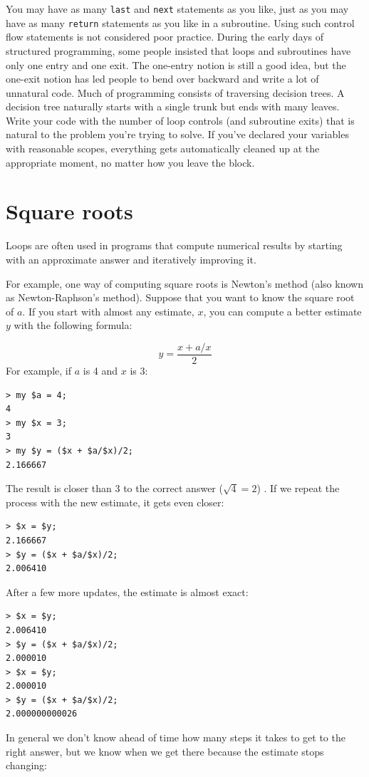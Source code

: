 You may have as many {\tt last} and {\tt next} statements as you 
like, just as you may have as many {\tt return} statements as 
you like in a subroutine. Using such control flow statements 
is not considered poor 
practice. During the early days of structured programming, 
some people insisted that loops and subroutines have only one 
entry and one exit. The one-entry notion is still a good idea, 
but the one-exit notion has led people to bend over backward 
and write a lot of unnatural code. Much of programming consists of traversing 
decision trees. A decision tree naturally starts with a single 
trunk but ends with many leaves. Write your code with the number 
of loop controls (and subroutine exits) that is natural to the 
problem you're trying to solve. If you've declared your variables 
with reasonable scopes, everything gets automatically cleaned up 
at the appropriate moment, no matter how you leave the block.


\section{Square roots}
\label{squareroot}

Loops are often used in programs that compute
numerical results by starting with an approximate answer and
iteratively improving it.

For example, one way of computing square roots is Newton's 
method (also known as Newton-Raphson's method).
Suppose that you want to know the square root of $a$.  If you start
with almost any estimate, $x$, you can compute a better
estimate $y$ with the following formula:

\[ y = \frac{x + a/x}{2} \]
%
For example, if $a$ is 4 and $x$ is 3:

\begin{verbatim}
> my $a = 4;
4
> my $x = 3;
3
> my $y = ($x + $a/$x)/2;
2.166667
\end{verbatim}
%
The result is closer than 3 to the correct answer 
($\sqrt{4} = 2$) .  If we repeat the process with the new estimate, it gets even closer:

\begin{verbatim}
> $x = $y;
2.166667
> $y = ($x + $a/$x)/2;
2.006410
\end{verbatim}
%
After a few more updates, the estimate is almost exact:

\begin{verbatim}
> $x = $y;
2.006410
> $y = ($x + $a/$x)/2;
2.000010
> $x = $y;
2.000010
> $y = ($x + $a/$x)/2;
2.000000000026
\end{verbatim}
%
In general we don't know ahead of time how many steps it takes
to get to the right answer, but we know when we get there
because the estimate stops changing:


